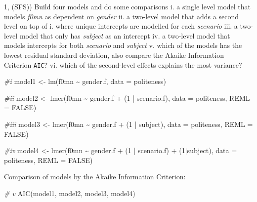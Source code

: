 \documentclass[
]{article}
\newenvironment{Shaded}{\begin{snugshade}}{\end{snugshade}}
\newcommand{\AttributeTok}[1]{\textcolor[rgb]{0.77,0.63,0.00}{#1}}
\newcommand{\CommentTok}[1]{\textcolor[rgb]{0.56,0.35,0.01}{\textit{#1}}}
\newcommand{\ConstantTok}[1]{\textcolor[rgb]{0.00,0.00,0.00}{#1}}
\newcommand{\DecValTok}[1]{\textcolor[rgb]{0.00,0.00,0.81}{#1}}
\newcommand{\FunctionTok}[1]{\textcolor[rgb]{0.00,0.00,0.00}{#1}}
\newcommand{\NormalTok}[1]{#1}
\newcommand{\OtherTok}[1]{\textcolor[rgb]{0.56,0.35,0.01}{#1}}
\newcommand{\SpecialCharTok}[1]{\textcolor[rgb]{0.00,0.00,0.00}{#1}}
\begin{document}
1, (SFS)) Build four models and do some comparisons i. a single level
model that models \emph{f0mn} as dependent on \emph{gender} ii. a
two-level model that adds a second level on top of i. where unique
intercepts are modelled for each \emph{scenario} iii. a two-level model
that only has \emph{subject} as an intercept iv. a two-level model that
models intercepts for both \emph{scenario} and \emph{subject} v. which
of the models has the lowest residual standard deviation, also compare
the Akaike Information Criterion \texttt{AIC}? vi. which of the
second-level effects explains the most variance?

\begin{Shaded}
\begin{Highlighting}[]
\CommentTok{\#i}
\NormalTok{model1 }\OtherTok{\textless{}{-}} \FunctionTok{lm}\NormalTok{(f0mn }\SpecialCharTok{\textasciitilde{}}\NormalTok{ gender.f, }\AttributeTok{data =}\NormalTok{ politeness)}

\CommentTok{\#ii}
\NormalTok{model2 }\OtherTok{\textless{}{-}} \FunctionTok{lmer}\NormalTok{(f0mn }\SpecialCharTok{\textasciitilde{}}\NormalTok{ gender.f }\SpecialCharTok{+}\NormalTok{ (}\DecValTok{1} \SpecialCharTok{|}\NormalTok{ scenario.f), }\AttributeTok{data =}\NormalTok{ politeness, }\AttributeTok{REML =} \ConstantTok{FALSE}\NormalTok{)}
                        
\CommentTok{\#iii}
\NormalTok{model3 }\OtherTok{\textless{}{-}} \FunctionTok{lmer}\NormalTok{(f0mn }\SpecialCharTok{\textasciitilde{}}\NormalTok{ gender.f }\SpecialCharTok{+}\NormalTok{ (}\DecValTok{1} \SpecialCharTok{|}\NormalTok{ subject), }\AttributeTok{data =}\NormalTok{ politeness, }\AttributeTok{REML =} \ConstantTok{FALSE}\NormalTok{)}

\CommentTok{\#iv}
\NormalTok{model4 }\OtherTok{\textless{}{-}} \FunctionTok{lmer}\NormalTok{(f0mn }\SpecialCharTok{\textasciitilde{}}\NormalTok{ gender.f }\SpecialCharTok{+}\NormalTok{ (}\DecValTok{1} \SpecialCharTok{|}\NormalTok{ scenario.f) }\SpecialCharTok{+}\NormalTok{ (}\DecValTok{1}\SpecialCharTok{|}\NormalTok{subject), }\AttributeTok{data =}\NormalTok{ politeness, }\AttributeTok{REML =} \ConstantTok{FALSE}\NormalTok{)}
\end{Highlighting}
\end{Shaded}

Comparison of models by the Akaike Information Criterion:

\begin{Shaded}
\begin{Highlighting}[]
\CommentTok{\# v}
\FunctionTok{AIC}\NormalTok{(model1, model2, model3, model4)}
\end{Highlighting}
\end{Shaded}
\end{document}
